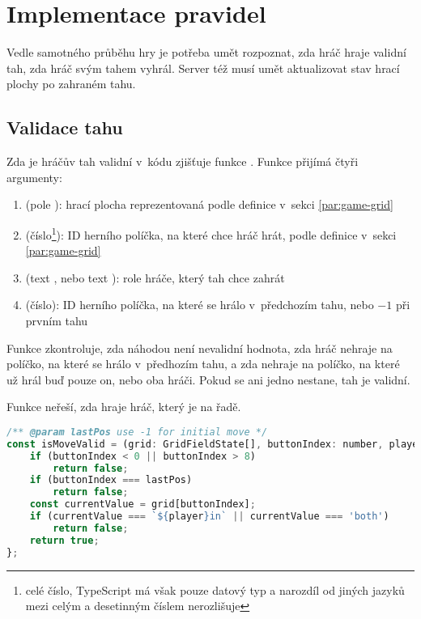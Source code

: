 \section{Implementace pravidel}\label{sec:rules-implementation}

Vedle samotného průběhu hry je potřeba umět rozpoznat, zda hráč hraje validní
tah, zda hráč svým tahem vyhrál. Server též musí umět aktualizovat stav hrací
plochy po zahraném tahu.

\subsection{Validace tahu}
Zda je hráčův tah validní v~kódu zjišťuje funkce . Funkce
přijímá čtyři argumenty:
\begin{enumerate}
    \item {} (pole ): hrací plocha reprezentovaná podle
        definice v~sekci \ref{par:game-grid}
    \item {} (číslo\footnote{celé číslo, TypeScript má však pouze
        datový typ  a narozdíl od jiných jazyků mezi celým a
        desetinným číslem nerozlišuje}): ID herního políčka, na které chce hráč
        hrát, podle definice v~sekci \ref{par:game-grid}
    \item {} (text , nebo text ): role hráče,
        který tah chce zahrát
    \item {} (číslo): ID herního políčka, na které se hrálo
v~předchozím tahu, nebo $-1$ při prvním tahu
\end{enumerate}

Funkce zkontroluje, zda  náhodou není nevalidní hodnota, zda
hráč nehraje na políčko, na které se hrálo v~předhozím tahu, a zda nehraje na
políčko, na které už hrál buď pouze on, nebo oba hráči. Pokud se ani jedno
nestane, tah je validní.

Funkce neřeší, zda hraje hráč, který je na řadě.

\begin{lstlisting}[language=JavaScript,caption={Funkce \M{isMoveValid}},label={lst:is-move-valid}]
/** @param lastPos use -1 for initial move */
const isMoveValid = (grid: GridFieldState[], buttonIndex: number, player: 'player1' | 'player2', lastPos: number) => {
    if (buttonIndex < 0 || buttonIndex > 8)
        return false;
    if (buttonIndex === lastPos)
        return false;
    const currentValue = grid[buttonIndex];
    if (currentValue === `${player}in` || currentValue === 'both')
        return false;
    return true;
};
\end{lstlisting}


